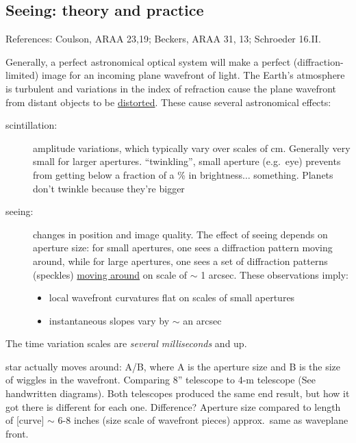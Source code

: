 \documentclass[12pt]{article}
\newcommand{\mynotes}[1]{\textcolor{myBlue}{#1}}
\begin{document}
\subsection{Seeing: theory and practice}
References: Coulson, ARAA 23,19; Beckers, ARAA 31, 13; Schroeder 16.II.

Generally, a perfect astronomical optical system will make a perfect
(diffraction-limited) image for an incoming plane wavefront of light. The
Earth's atmosphere is turbulent and variations in the index of refraction
cause the plane wavefront from distant objects to be \href{http://astronomy.nmsu.edu/holtz/a535/html/diagrams/a535/seeing.htm}
{distorted}. These cause several astronomical effects:
\begin{description}
    \item [scintillation:] amplitude variations, which typically vary over
        scales of cm. Generally very small for larger apertures.
        \mynotes{``twinkling'', small aperture (e.g.\ eye) prevents from
        getting below a fraction of a \% in brightness$\ldots$ something.
        Planets don't twinkle because they're bigger}
    \item [seeing:] changes in position and image quality. The effect of seeing
        depends on aperture size: for small apertures, one sees a diffraction
        pattern moving around, while for large apertures, one sees a set of
        diffraction patterns (speckles) \href{https://en.wikipedia.org/wiki/Speckle_imaging#/media/File:Eps_aql_movie_not_2000.gif}
        {moving around} on scale of $\sim$ 1 arcsec. These observations imply:
        \begin{itemize}
            \item local wavefront curvatures flat on scales of small apertures
            \item instantaneous slopes vary by $\sim$ an arcsec
        \end{itemize}
\end{description}
The time variation scales are \emph{several milliseconds} and up.

\mynotes{star actually moves around: A/B, where A is the aperture size and B is
the size of wiggles in the wavefront. Comparing 8'' telescope to 4-m telescope
(See handwritten diagrams). Both telescopes produced the same end result, but
how it got there is different for each one. Difference? Aperture size compared
to length of [curve] $\sim$ 6-8 inches (size scale of wavefront pieces)
approx.\ same as waveplane front.}
\end{document}

